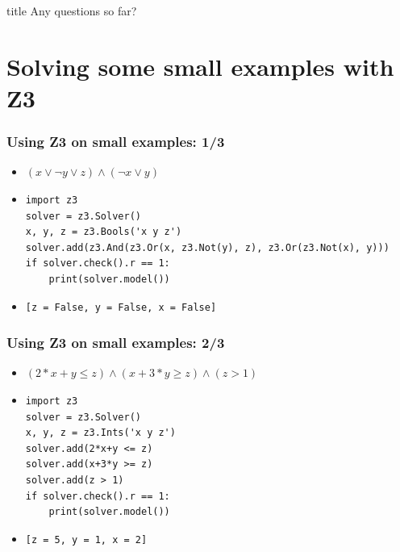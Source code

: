 \documentclass[aspectratio=169]{beamer}
\newcommand{\questionsslide}[1]{
  \begin{frame}
  \vfill
  \centering
  \begin{beamercolorbox}[sep=8pt,center,shadow=true,rounded=true]{title}
    \usebeamerfont{title}Any questions#1?\par%
  \end{beamercolorbox}
  \vfill
  \end{frame}
}
\begin{document}
\questionsslide{ so far}
\section{Solving some small examples with Z3}

\begin{frame}[fragile]
\frametitle{Using Z3 on small examples: 1/3}
\begin{itemize}
\item $(x \lor \neg y \lor z) \land (\neg x \lor y)$
\item \begin{Verbatim}[fontsize=\scriptsize, frame=single]
import z3
solver = z3.Solver()
x, y, z = z3.Bools('x y z')
solver.add(z3.And(z3.Or(x, z3.Not(y), z), z3.Or(z3.Not(x), y)))
if solver.check().r == 1:
    print(solver.model())
\end{Verbatim}
\item \begin{Verbatim}[fontsize=\scriptsize, frame=single]
[z = False, y = False, x = False]
\end{Verbatim}
\end{itemize}
\end{frame}

\begin{frame}[fragile]
\frametitle{Using Z3 on small examples: 2/3}
\begin{itemize}
\item $(2*x+y \le z) \land (x+3*y \ge z) \land (z > 1)$
\item \begin{Verbatim}[fontsize=\scriptsize, frame=single]
import z3
solver = z3.Solver()
x, y, z = z3.Ints('x y z')
solver.add(2*x+y <= z)
solver.add(x+3*y >= z)
solver.add(z > 1)
if solver.check().r == 1:
    print(solver.model())
\end{Verbatim}
\item \begin{Verbatim}[fontsize=\scriptsize, frame=single]
[z = 5, y = 1, x = 2]
\end{Verbatim}
\end{itemize}
\end{frame}
\end{document}
